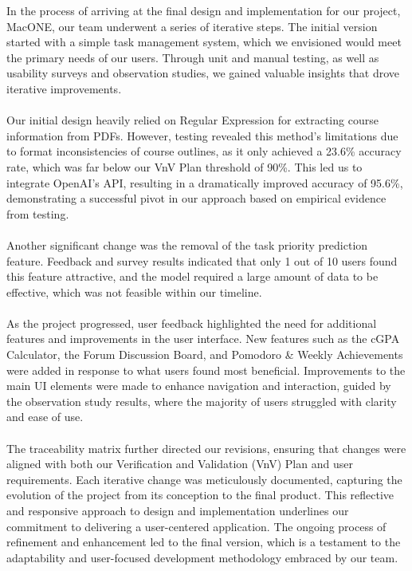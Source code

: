 \documentclass{article}
\begin{document}
In the process of arriving at the final design and implementation for our project, MacONE, our team underwent a series of iterative steps. The initial version started with a simple task management system, which we envisioned would meet the primary needs of our users. Through unit and manual testing, as well as usability surveys and observation studies, we gained valuable insights that drove iterative improvements. \\
\\
Our initial design heavily relied on Regular Expression for extracting course information from PDFs. However, testing revealed this method's limitations due to format inconsistencies of course outlines, as it only achieved a 23.6\% accuracy rate, which was far below our VnV Plan threshold of 90\%. This led us to integrate OpenAI's API, resulting in a dramatically improved accuracy of 95.6\%, demonstrating a successful pivot in our approach based on empirical evidence from testing.\\
\\
Another significant change was the removal of the task priority prediction feature. Feedback and survey results indicated that only 1 out of 10 users found this feature attractive, and the model required a large amount of data to be effective, which was not feasible within our timeline.\\
\\
As the project progressed, user feedback highlighted the need for additional features and improvements in the user interface. New features such as the cGPA Calculator, the Forum Discussion Board, and Pomodoro & Weekly Achievements were added in response to what users found most beneficial. Improvements to the main UI elements were made to enhance navigation and interaction, guided by the observation study results, where the majority of users struggled with clarity and ease of use.\\
\\
The traceability matrix further directed our revisions, ensuring that changes were aligned with both our Verification and Validation (VnV) Plan and user requirements. Each iterative change was meticulously documented, capturing the evolution of the project from its conception to the final product. This reflective and responsive approach to design and implementation underlines our commitment to delivering a user-centered application. The ongoing process of refinement and enhancement led to the final version, which is a testament to the adaptability and user-focused development methodology embraced by our team.
\end{document}
